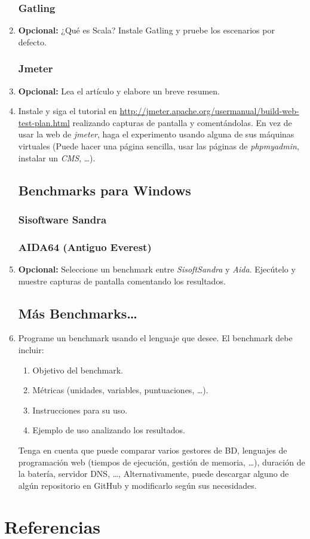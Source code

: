 \documentclass[paper=a4, fontsize=11pt]{scrartcl} %
\numberwithin{equation}{section} %
\numberwithin{figure}{section} %
\numberwithin{table}{section} %
\begin{document}
\begin{enumerate}
	\subsubsection{Gatling}
		\item \textbf{Opcional:} ¿Qué es Scala? Instale Gatling y pruebe los escenarios por defecto.
		
	\subsubsection{Jmeter}
		\item \textbf{Opcional:} Lea el artículo y elabore un breve resumen.
		
		\item Instale y siga el tutorial en \url{http://jmeter.apache.org/usermanual/build-web-test-plan.html}
		realizando capturas de pantalla y comentándolas. En vez de usar la web de \textit{jmeter},
		haga el experimento usando alguna de sus máquinas virtuales (Puede hacer una página sencilla,
		usar las páginas de \textit{phpmyadmin}, instalar un \textit{CMS}, \dots).
		
	\subsection{Benchmarks para Windows}
	\subsubsection{Sisoftware Sandra}
	\subsubsection{AIDA64 (Antiguo Everest)}
		\item \textbf{Opcional:} Seleccione un benchmark entre \textit{SisoftSandra} y \textit{Aida}.
		Ejecútelo y muestre capturas de pantalla comentando los resultados.
		
	\subsection{Más Benchmarks\dots}
		\item Programe un benchmark usando el lenguaje que desee. El benchmark debe incluir:
		\begin{enumerate}
			\item Objetivo del benchmark.
			\item Métricas (unidades, variables, puntuaciones, \dots).
			\item Instrucciones para su uso.
			\item Ejemplo de uso analizando los resultados.
		\end{enumerate}
		Tenga en cuenta que puede comparar varios gestores de BD, lenguajes de programación web (tiempos
		de ejecución, gestión de memoria, \dots), duración de la batería, servidor DNS, \dots,
		Alternativamente, puede descargar alguno de algún repositorio en GitHub y modificarlo según sus
		necesidades.
		
\end{enumerate}

\newpage
\section{Referencias}

\end{document}
